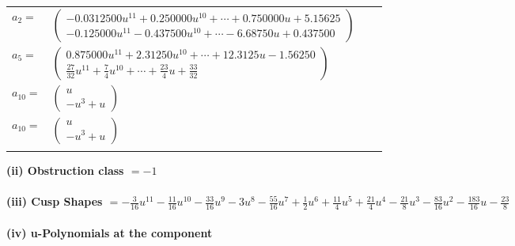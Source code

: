 \documentclass[1p]{elsarticle_modified}
\theoremstyle{definition}
\begin{document}
\begin{tabular}{m{7pt} m{180pt} m{7pt} m{180pt} }
\flushright $a_{2}=$&$\begin{pmatrix}-0.0312500 u^{11}+0.250000 u^{10}+\cdots+0.750000 u+5.15625\\-0.125000 u^{11}-0.437500 u^{10}+\cdots-6.68750 u+0.437500\end{pmatrix}$ \\
\flushright $a_{5}=$&$\begin{pmatrix}0.875000 u^{11}+2.31250 u^{10}+\cdots+12.3125 u-1.56250\\\frac{27}{32} u^{11}+\frac{7}{4} u^{10}+\cdots+\frac{23}{4} u+\frac{33}{32}\end{pmatrix}$ \\
\flushright $a_{10}=$&$\begin{pmatrix}u\\- u^3+u\end{pmatrix}$\\ \flushright $a_{10}=$&$\begin{pmatrix}u\\- u^3+u\end{pmatrix}$\\&\end{tabular}
\flushleft \textbf{(ii) Obstruction class $= -1$}\\~\\
\flushleft \textbf{(iii) Cusp Shapes $= -\frac{3}{16} u^{11}-\frac{11}{16} u^{10}-\frac{33}{16} u^9-3 u^8-\frac{55}{16} u^7+\frac{1}{2} u^6+\frac{11}{4} u^5+\frac{21}{4} u^4-\frac{21}{8} u^3-\frac{83}{16} u^2-\frac{183}{16} u-\frac{23}{8}$}\\~\\
\newpage\renewcommand{\arraystretch}{1}
\flushleft \textbf{(iv) u-Polynomials at the component}\newline \\
\end{document}
